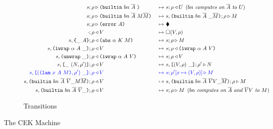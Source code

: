 \documentclass[../plutus-core-specification.tex]{subfiles}
\begin{document}
\begin{figure}[!ht]
\begin{subfigure}[c]{\linewidth}
{\begin{alignat*}{2}
       s; \rho &\compute \builtin{bn}{\repetition{A}}{} &~\mapsto~& s;\rho \return U \enspace (\textit{$bn$ computes on $\repetition{A}$ to $U$})\\
       s; \rho &\compute \builtin{bn}{\repetition{A}}{M \repetition{M}} &~\mapsto~& s,\inBuiltin{bn}{\repetition{A}}{}{\_}{\repetition{M}};\rho \compute M\\
       s; \rho &\compute \error{A} &~\mapsto~& \ckerror{}\\
       \cdot; \rho &\return V &~\mapsto~& \square (V, \rho)\\
       s,\inInstLeftFrame{A}; \rho &\return \abs{\alpha}{K}{M} &~\mapsto~& s;\rho \compute{M} \\
       s,\inWrapRightFrame{\alpha}{A}; \rho &\return V &~\mapsto~& s;\rho \return \wrap{\alpha}{A}{V}\\
       s,\inUnwrapFrame{}; \rho &\return \wrap{\alpha}{A}{V} &~\mapsto~& s;\rho \return V\\
       s,\inAppLeftFrame{(N,\rho^{\prime})}; \rho &\return V &~\mapsto~& s, \inAppRightFrame{(V,\rho)};\rho^{\prime} \compute N\\
       \blue{s,\inAppRightFrame{(\lam{x}{A}{M}, \rho^{\prime})}; \rho} &\breturn V &~\bmapsto~& \blue{s;\rho^{\prime}[x\mapsto (V,\rho)] \compute M}\\  %
       s,  \inBuiltin{bn}{\repetition{A}}{\repetition{V}}{\_}{M \repetition{M}}{}; \rho&\return V &~\mapsto~& s, \inBuiltin{bn}{\repetition{A}}{\repetition{V} V}{\_}{\repetition{M}};\rho \compute M\\
       s,\inBuiltin {bn} {\repetition{A}} {\repetition{V}}{\_}{}; \rho &\return V 
                                                 &~\mapsto~& s;\rho \compute M \enspace (\textit{$bn$ computes on $\repetition{A}$ and $\repetition{V}V$ to $M$})\\
\end{alignat*}
}
\caption{Transitions}
\end{subfigure}
\caption{The CEK Machine}\label{fig:cek-machine}
\end{figure}
\end{document}
